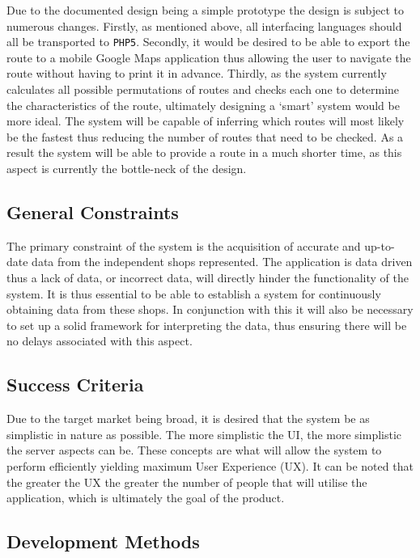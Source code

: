 \documentclass[10pt, a4paper, onecolumn]{scrartcl}
\begin{document}
			Due to the documented design being a simple prototype the design is subject to numerous changes. Firstly, as mentioned above, all interfacing languages should all be transported to \texttt{PHP5}. Secondly, it would be desired to be able to export the route to a mobile Google Maps application thus allowing the user to navigate the route without having to print it in advance. Thirdly, as the system currently calculates all possible permutations of routes and checks each one to determine the characteristics of the route, ultimately designing a `smart' system would be more ideal. The system will be capable of inferring which routes will most likely be the fastest thus reducing the number of routes that need to be checked. As a result the system will be able to provide a route in a much shorter time, as this aspect is currently the bottle-neck of the design. 
			
		\subsection{General Constraints}
		
			The primary constraint of the system is the acquisition of accurate and up-to-date data from the independent shops represented. The application is data driven thus a lack of data, or incorrect data, will directly hinder the functionality of the system. It is thus essential to be able to establish a system for continuously obtaining data from these shops. In conjunction with this it will also be necessary to set up a solid framework for interpreting the data, thus ensuring there will be no delays associated with this aspect.
		
		\subsection{Success Criteria}
		
			Due to the target market being broad, it is desired that the system be as simplistic in nature as possible. The more simplistic the UI, the more simplistic the server aspects can be. These concepts are what will allow the system to perform efficiently yielding maximum User Experience (UX). It can be noted that the greater the UX the greater the number of people that will utilise the application, which is ultimately the goal of the product. \\
			
		\subsection{Development Methods}
		
\end{document}
